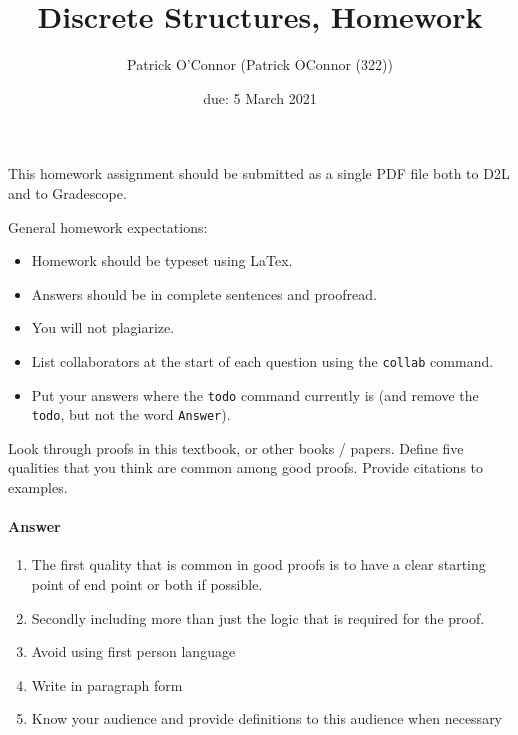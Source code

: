 \documentclass{article}
\title{Discrete Structures, Homework \hwnum}
\author{{Patrick O'Connor} (Patrick OConnor (322))}
\date{due: 5 March 2021}
\begin{document}
\maketitle

This homework assignment should be
submitted as a single PDF file both to D2L and to Gradescope.

General homework expectations:
\begin{itemize}
    \item Homework should be typeset using LaTex.
    \item Answers should be in complete sentences and proofread.
    \item You will not plagiarize.
    \item List collaborators at the start of each question using the \texttt{collab} command.
    \item Put your answers where the \texttt{todo} command currently is (and
        remove the \texttt{todo}, but not the word \texttt{Answer}).
\end{itemize}


 

Look through proofs in this textbook, or other books / papers.  Define five
qualities that you think are common among good proofs. Provide citations to
examples.


\paragraph{Answer}
\begin{enumerate}
  \item The first quality that is common in good proofs is to have a clear starting point
    of end point or both if possible.

  \item Secondly including more than just the logic that is required for the proof.

  \item Avoid using first person language

  \item Write in paragraph form

  \item Know your audience and provide definitions to this audience when necessary

\end{enumerate}
\end{document}
